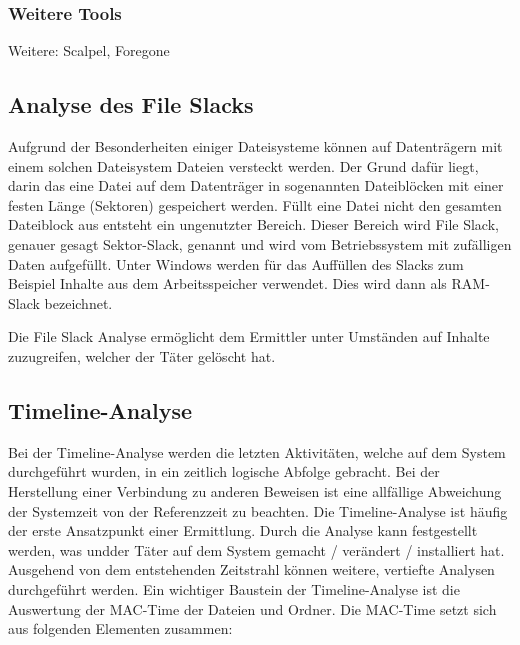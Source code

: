 \subsubsection{Weitere Tools} 
Weitere: Scalpel, Foregone



\subsection{Analyse des File Slacks}
Aufgrund der Besonderheiten einiger Dateisysteme können auf Datenträgern mit einem solchen Dateisystem Dateien versteckt werden. Der Grund dafür liegt, darin das eine Datei auf dem Datenträger in sogenannten Dateiblöcken mit einer festen Länge (Sektoren) gespeichert werden. Füllt eine Datei nicht den gesamten Dateiblock aus entsteht ein ungenutzter Bereich. Dieser Bereich wird File Slack, genauer gesagt Sektor-Slack, genannt und wird vom Betriebssystem mit zufälligen Daten aufgefüllt. Unter Windows werden für das Auffüllen des Slacks zum Beispiel Inhalte aus dem Arbeitsspeicher verwendet. Dies wird dann als RAM-Slack bezeichnet. 


Die File Slack Analyse ermöglicht dem Ermittler unter Umständen auf Inhalte zuzugreifen, welcher der Täter gelöscht hat.



\subsection{Timeline-Analyse}
Bei der Timeline-Analyse werden die letzten Aktivitäten, welche auf dem System durchgeführt wurden, in ein zeitlich logische Abfolge gebracht. Bei der Herstellung einer Verbindung zu anderen Beweisen ist eine allfällige Abweichung der Systemzeit von der Referenzzeit zu beachten. Die Timeline-Analyse ist häufig der erste Ansatzpunkt einer Ermittlung. Durch die Analyse kann festgestellt werden, was undder Täter auf dem System gemacht / verändert / installiert hat. Ausgehend von dem entstehenden Zeitstrahl können weitere, vertiefte Analysen durchgeführt werden. Ein wichtiger Baustein der Timeline-Analyse ist die Auswertung der MAC-Time der Dateien und Ordner. Die MAC-Time setzt sich aus folgenden Elementen zusammen:

